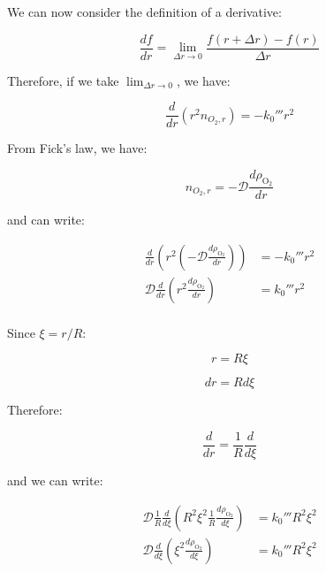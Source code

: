 \documentclass[letterpaper,12pt]{article}
\begin{document}
We can now consider the definition of a derivative:

\begin{equation}
    \frac{df}{dr} = \lim_{\Delta r \to 0} \frac{f(r + \Delta r) - f(r)}{\Delta r}
\end{equation}

Therefore, if we take $\lim_{\Delta r \to 0}$, we have:

\begin{equation}
    \frac{d}{dr} \left( r^2 n_{O_{2}, r} \right) = -k_0''' r^2
\end{equation}

From Fick's law, we have:

\begin{equation}
    n_{O_{2}, r} = - \mathcal{D} \frac{d\rho_{\mathrm{O}_2}}{dr}
\end{equation}

and can write:

\begin{equation}
\begin{aligned}
    \frac{d}{dr} \left( r^2 \left( - \mathcal{D} \frac{d\rho_{\mathrm{O}_2}}{dr}\right) \right) &= -k_0''' r^2 \\
    \mathcal{D} \frac{d}{dr} \left( r^2 \frac{d\rho_{\mathrm{O}_2}}{dr}\right)                  &= k_0''' r^2 \\
\end{aligned}
\end{equation}

Since $\xi = r/R$:

\begin{equation}
    r = R \xi
\end{equation}

\begin{equation}
    dr = R d \xi
\end{equation}

Therefore:

\begin{equation}
    \frac{d}{dr} = \frac{1}{R} \frac{d}{d \xi}
\end{equation}

and we can write:

\begin{equation}
\begin{aligned}
    \mathcal{D} \frac{1}{R} \frac{d}{d \xi} \left( R^2 \xi^2 \frac{1}{R} \frac{d\rho_{\mathrm{O}_2}}{d \xi}\right) &= k_0''' R^2 \xi^2 \\
    \mathcal{D} \frac{d}{d \xi} \left( \xi^2 \frac{d\rho_{\mathrm{O}_2}}{d \xi}\right) &= k_0''' R^2 \xi^2 \\
\end{aligned}
\end{equation}
\end{document}
